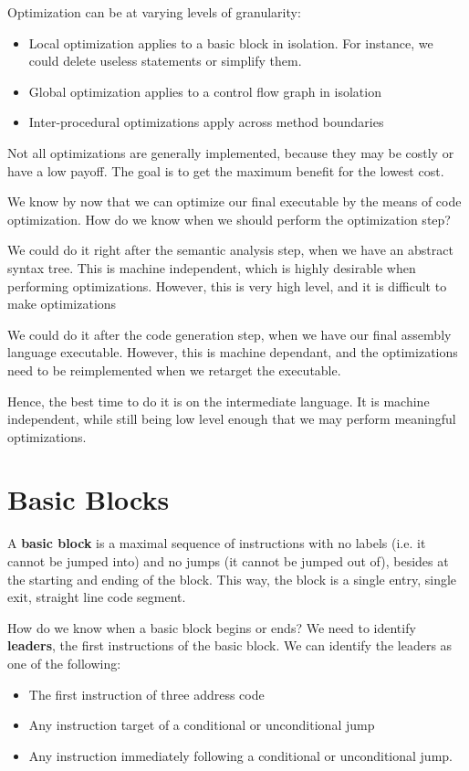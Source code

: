 \documentclass[12pt,letterpaper]{book}
\theoremstyle{definition}
\begin{document}
Optimization can be at varying levels of granularity:
\begin{itemize}
  \item Local optimization applies to a basic block in isolation. For instance, we could delete useless statements or simplify them.
  \item Global optimization applies to a control flow graph in isolation
  \item Inter-procedural optimizations apply across method boundaries
\end{itemize}

Not all optimizations are generally implemented, because they may be costly or have a low payoff. The goal is to get the maximum benefit for the lowest cost.

We know by now that we can optimize our final executable by the means of code optimization. How do we know when we should perform the optimization step?

We could do it right after the semantic analysis step, when we have an abstract syntax tree. This is machine independent, which is highly desirable when performing optimizations. However, this is very high level, and it is difficult to make optimizations

We could do it after the code generation step, when we have our final assembly language executable. However, this is machine dependant, and the optimizations need to be reimplemented when we retarget the executable.

Hence, the best time to do it is on the intermediate language. It is machine independent, while still being low level enough that we may perform meaningful optimizations.

\section{Basic Blocks}

A \textbf{basic block} is a maximal sequence of instructions with no labels (i.e. it cannot be jumped into) and no jumps (it cannot be jumped out of), besides at the starting and ending of the block. This way, the block is a single entry, single exit, straight line code segment.

How do we know when a basic block begins or ends? We need to identify \textbf{leaders}, the first instructions of the basic block. We can identify the leaders as one of the following:

\begin{itemize}
  \item The first instruction of three address code
  \item Any instruction target of a conditional or unconditional jump
  \item Any instruction immediately following a conditional or unconditional jump.
\end{itemize}
\end{document}
